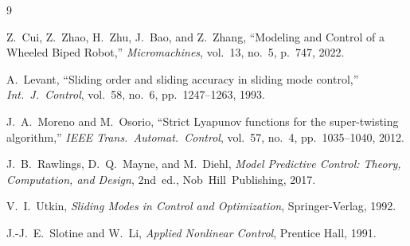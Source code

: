 \documentclass[11pt,a4paper]{article}
\begin{document}
\begin{thebibliography}{9}

Z.\ Cui, Z.\ Zhao, H.\ Zhu, J.\ Bao, and Z.\ Zhang,
``Modeling and Control of a Wheeled Biped Robot,''
\emph{Micromachines}, vol.\ 13, no.\ 5, p.\ 747, 2022.

A.\ Levant,
``Sliding order and sliding accuracy in sliding mode control,''
\emph{Int.\ J.\ Control}, vol.\ 58, no.\ 6, pp.\ 1247--1263, 1993.

J.\ A.\ Moreno and M.\ Osorio,
``Strict Lyapunov functions for the super-twisting algorithm,''
\emph{IEEE Trans.\ Automat.\ Control}, vol.\ 57, no.\ 4, pp.\ 1035--1040, 2012.

J.\ B.\ Rawlings, D.\ Q.\ Mayne, and M.\ Diehl,
\emph{Model Predictive Control: Theory, Computation, and Design}, 2nd~ed.,
Nob~Hill~Publishing, 2017.

V.\ I.\ Utkin,
\emph{Sliding Modes in Control and Optimization},
Springer-Verlag, 1992.

J.-J.\ E.\ Slotine and W.\ Li,
\emph{Applied Nonlinear Control},
Prentice Hall, 1991.

\end{thebibliography}
\end{document}
